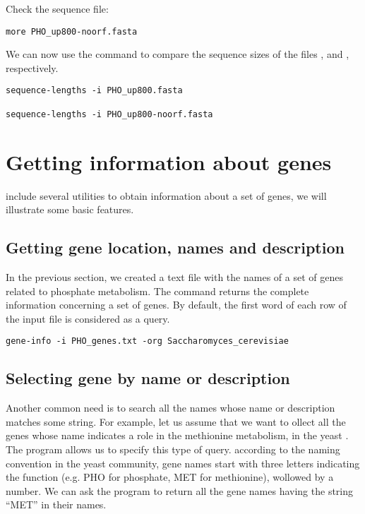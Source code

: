 Check the sequence file:

{\color{Blue} \begin{footnotesize}
\begin{verbatim}
more PHO_up800-noorf.fasta
\end{verbatim} \end{footnotesize}
}

We can now use the command  to compare the
sequence sizes of the files , and
, respectively.

{\color{Blue} \begin{footnotesize}
\begin{verbatim}
sequence-lengths -i PHO_up800.fasta

sequence-lengths -i PHO_up800-noorf.fasta
\end{verbatim} \end{footnotesize}
}

\section{Getting information about genes}

\RSAT include several utilities to obtain information about a set of
genes, we will illustrate some basic features. 

\subsection{Getting gene location, names and description}

In the previous section, we created a text file with the names of a
set of genes related to phosphate metabolism. The command
 returns the complete information concerning a set
of genes. By default, the first word of each row of the input file is
considered as a query.

{\color{Blue} \begin{footnotesize}
\begin{verbatim}
gene-info -i PHO_genes.txt -org Saccharomyces_cerevisiae
\end{verbatim} \end{footnotesize}
}


\subsection{Selecting gene by name or description}

Another common need is to search all the names whose name or
description matches some string. For example, let us assume that we
want to ollect all the genes whose name indicates a role in the
methionine metabolism, in the yeast .
The program  allows us to specify this type of
query. according to the naming convention in the yeast community, gene
names start with three letters indicating the function (e.g. PHO for
phosphate, MET for methionine), wollowed by a number. We can ask the
program to return all the gene names having the string ``MET'' in
their names. 

